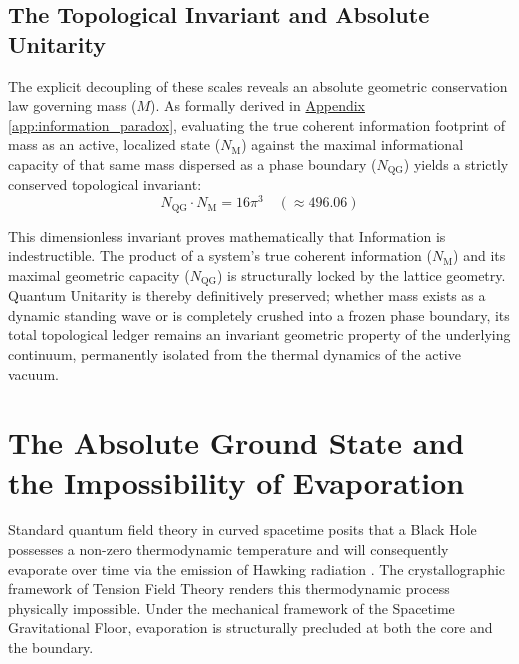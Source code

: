\subsection{The Topological Invariant and Absolute Unitarity}

The explicit decoupling of these scales reveals an absolute geometric conservation law governing mass ($M$). As formally derived in \hyperref[app:information_paradox]{Appendix \ref*{app:information_paradox}}, evaluating the true coherent information footprint of mass as an active, localized state ($N_{\mathrm{M}}$) against the maximal informational capacity of that same mass dispersed as a phase boundary ($N_{\mathrm{QG}}$) yields a strictly conserved topological invariant:
\begin{equation}
    N_{\mathrm{QG}} \cdot N_{\mathrm{M}} = 16\pi^3 \quad (\approx 496.06)
\end{equation}

This dimensionless invariant proves mathematically that Information is indestructible. The product of a system's true coherent information ($N_{\mathrm{M}}$) and its maximal geometric capacity ($N_{\mathrm{QG}}$) is structurally locked by the lattice geometry. Quantum Unitarity is thereby definitively preserved; whether mass exists as a dynamic standing wave or is completely crushed into a frozen phase boundary, its total topological ledger remains an invariant geometric property of the underlying continuum, permanently isolated from the thermal dynamics of the active vacuum.

\section{The Absolute Ground State and the Impossibility of Evaporation}

Standard quantum field theory in curved spacetime posits that a Black Hole possesses a non-zero thermodynamic temperature and will consequently evaporate over time via the emission of Hawking radiation \cite{Hawking_1975}. The crystallographic framework of Tension Field Theory renders this thermodynamic process physically impossible. Under the mechanical framework of the Spacetime Gravitational Floor, evaporation is structurally precluded at both the core and the boundary.

